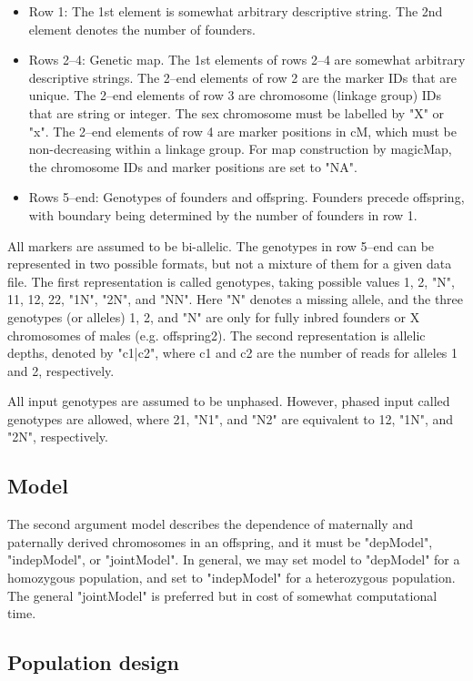 \documentclass[12pt]{article}
\begin{document}
\begin{itemize}[noitemsep]
\item Row 1: The 1st element is somewhat arbitrary descriptive string. The 2nd element denotes the number of founders. 
\item Rows 2--4: Genetic map. The 1st elements of rows 2--4 are somewhat arbitrary descriptive strings. The 2--end elements of row  2 are the marker IDs that are unique. The 2--end elements of row 3 are chromosome (linkage group) IDs that are string or integer. The sex chromosome must be labelled by "X" or "x". The 2--end elements of row 4 are marker positions in cM, which must be non-decreasing within a linkage group. For map construction by magicMap, the chromosome IDs and marker positions are set to "NA". 
\item Rows 5--end: Genotypes of founders and offspring. Founders precede offspring, with boundary being determined by the number of founders in row 1. 
\end{itemize}

All markers are assumed to be bi-allelic. The genotypes in row 5--end can be represented in two possible formats, but not a mixture of them for a given data file. The first representation is called genotypes, taking possible values 1, 2, "N", 11, 12, 22, "1N", "2N", and "NN". Here "N" denotes a missing allele, and the three genotypes (or alleles) 1, 2, and "N" are only for fully inbred founders or X chromosomes of males (e.g. offspring2). The second representation is allelic depths, denoted by "c1|c2", where c1 and c2 are the number of reads for alleles 1 and 2, respectively. 

All input genotypes are assumed to be unphased. However, phased input called genotypes are allowed, where 21, "N1", and "N2" are equivalent to 12, "1N", and "2N", respectively. 

\subsection{Model}

The second argument model describes the dependence of maternally and paternally derived chromosomes in an offspring, and it must be "depModel", "indepModel", or "jointModel". In general, we may set model to "depModel" for a homozygous population,  and set to "indepModel" for a heterozygous population. The general "jointModel" is preferred but in cost of somewhat computational time. 

\subsection{Population design}
\end{document}
